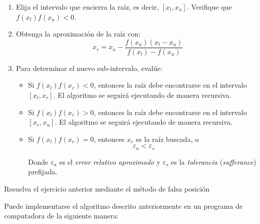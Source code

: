 \begin{enumerate}
	
	\item Elija el intervalo que encierra la raíz, es decir, $[x_l, x_u]$.
		Verifique que $f(x_l)f(x_u) < 0$.

	\item Obtenga la aproximación de la raíz con:
		\begin{equation*}
			x_r = x_u - \frac{f(x_u)(x_l-x_u)}{f(x_l) - f(x_u)}
		\end{equation*}

	\item Para determinar el nuevo sub-intervalo, evalúe:
		\begin{itemize}
			\item Si $f(x_l)f(x_r) < 0$, entonces la raíz debe
				encontrarse en el intervalo $[x_l, x_r]$. El
				algoritmo se seguirá ejecutando de manera
				recursiva.
			\item Si $f(x_l)f(x_r) > 0$, entonces la raíz debe
				encontrarse en el intervalo $[x_r, x_u]$. El
				algoritmo se seguirá ejecutando de manera
				recursiva.

			\item Si $f(x_l) f(x_r) = 0$, entonces $x_r$ es la raíz
				buscada, o
				\[
					\varepsilon_a < \varepsilon_s
				\]

                Donde $\varepsilon_a$ es el \emph{error relativo aproximado} y
                $\varepsilon_s$ es la \emph{tolerancia} (\textit{sufferance})
                prefijada.
		\end{itemize}
\end{enumerate}

\begin{ex}
	Resuelva el ejercicio anterior mediante el método de falsa posición
	
	\begin{solution}

		Puede implementarse el algoritmo descrito anteriormente en un
		programa de computadora de la siguiente manera:

		

		
	\end{solution}
\end{ex}

